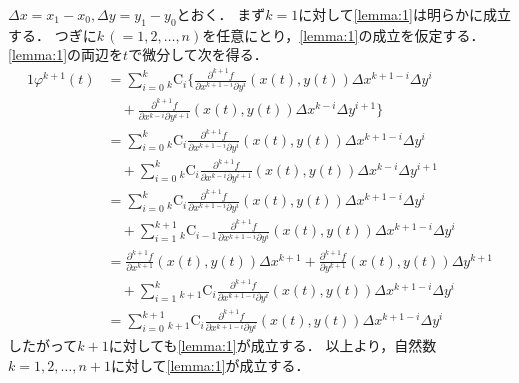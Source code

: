 \documentclass{article}
\makeatletter
\renewenvironment{proof}[1][\proofname]{\par
        \pushQED{\qed}
        \normalfont
        \topsep6\p@\@plus6\p@ \trivlist
        \item[\hskip\labelsep{\bfseries #1}\@addpunct{\bfseries}]\ignorespaces
    }{%
        \popQED\endtrivlist\@endpefalse
    }
\renewcommand{\proofname}{\underline{証明.}}
\newcommand{\combination}[2]{{}_{#1} \mathrm{C}_{#2}}
\makeatother
\begin{document}
\begin{proof}
    $\Delta x = x_1 - x_0, \Delta y = y_1 - y_0$とおく．
    まず$k=1$に対して\cref{lemma:1}は明らかに成立する．
    つぎに$k\,(=1,2,\dots,n)$を任意にとり，\cref{lemma:1}の成立を仮定する．
    \cref{lemma:1}の両辺を$t$で微分して次を得る．
    \begin{alignat}{1}
        \varphi^{k+1}(t) &= 
            \sum_{i=0}^{k}
                \combination{k}{i}
                \bigg\{
                \frac{\partial^{k+1} f}{\partial x^{k+1-i} \partial y^{i}} (x(t), y(t))
                \Delta x^{k+1-i}
                \Delta y^{i} \nonumber \\
        &\quad +
                \frac{\partial^{k+1} f}{\partial x^{k-i} \partial y^{i+1}} (x(t), y(t))
                \Delta x^{k-i}
                \Delta y^{i+1}
                \bigg\} \\
        &= 
            \sum_{i=0}^{k}
                \combination{k}{i}
                \frac{\partial^{k+1} f}{\partial x^{k+1-i} \partial y^{i}} (x(t), y(t))
                \Delta x^{k+1-i}
                \Delta y^{i} \nonumber \\
        &\quad +
            \sum_{i=0}^{k}
                \combination{k}{i}
                \frac{\partial^{k+1} f}{\partial x^{k-i} \partial y^{i+1}} (x(t), y(t))
                \Delta x^{k-i}
                \Delta y^{i+1} \\
        &= 
            \sum_{i=0}^{k}
                \combination{k}{i}
                \frac{\partial^{k+1} f}{\partial x^{k+1-i} \partial y^{i}} (x(t), y(t))
                \Delta x^{k+1-i}
                \Delta y^{i} \nonumber \\
        &\quad +
            \sum_{i=1}^{k+1}
                \combination{k}{i-1}
                \frac{\partial^{k+1} f}{\partial x^{k+1-i} \partial y^{i}} (x(t), y(t))
                \Delta x^{k+1-i}
                \Delta y^{i} \\
        &= 
            \frac{\partial^{k+1} f}{\partial x^{k+1}} (x(t), y(t))
            \Delta x^{k+1}
            +
            \frac{\partial^{k+1} f}{\partial y^{k+1}} (x(t), y(t))
            \Delta y^{k+1} \nonumber \\
        &\quad +
            \sum_{i=1}^{k}
                \combination{k+1}{i}
                \frac{\partial^{k+1} f}{\partial x^{k+1-i} \partial y^{i}} (x(t), y(t))
                \Delta x^{k+1-i}
                \Delta y^{i} \\
        &=
            \sum_{i=0}^{k+1}
                \combination{k+1}{i}
                \frac{\partial^{k+1} f}{\partial x^{k+1-i} \partial y^{i}} (x(t), y(t))
                \Delta x^{k+1-i}
                \Delta y^{i}
    \end{alignat}
    したがって$k+1$に対しても\cref{lemma:1}が成立する．
    以上より，自然数$k=1,2,\dots,n+1$に対して\cref{lemma:1}が成立する．
\end{proof}
\end{document}
